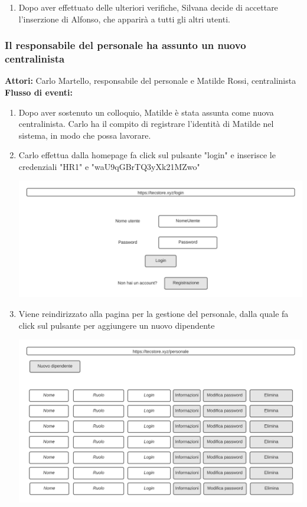 \documentclass[12pt,a4paper]{article}
\begin{document}
\begin{enumerate}
\item Dopo aver effettuato delle ulteriori verifiche, Silvana decide di accettare l'inserzione di Alfonso, che apparirà a tutti gli altri utenti.
\end{enumerate}

\newpage

\subsubsection{Il responsabile del personale ha assunto un nuovo centralinista}
\textbf{Attori:} Carlo Martello, responsabile del personale e Matilde Rossi, centralinista \\

\noindent
\textbf{Flusso di eventi:}
\begin{enumerate}
\item Dopo aver sostenuto un colloquio, Matilde è stata assunta come nuova centralinista. Carlo ha il compito di registrare l'identità di Matilde nel sistema, in modo che possa lavorare.

\item Carlo effettua dalla homepage fa click sul pulsante "login" e inserisce le credenziali "HR1" e "waU9qGBrTQ3yXk21MZwo"

\includegraphics[width=\textwidth]{Mockup/login}

\newpage
\item Viene reindirizzato alla pagina per la gestione del personale, dalla quale fa click sul pulsante per aggiungere un nuovo dipendente

\includegraphics[width=\textwidth]{Mockup/personale}


\end{enumerate}
\end{document}
